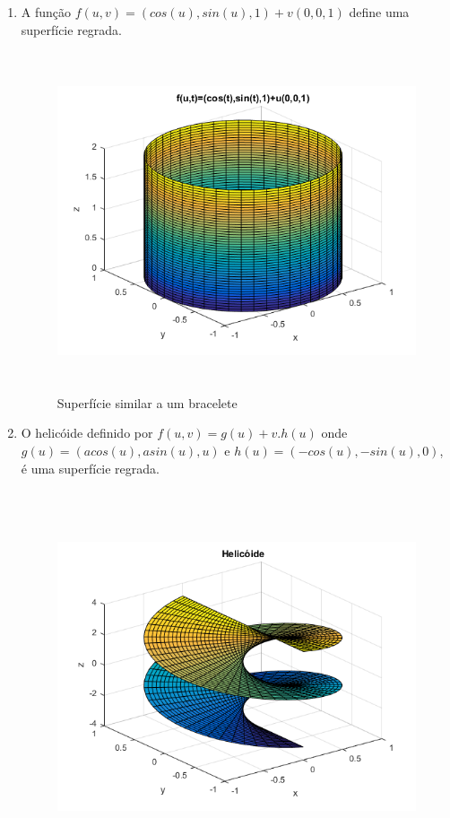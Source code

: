 \documentclass[a4paper]{article}
\begin{document}
\begin{enumerate}
\item A função $f(u,v)=(cos(u),sin(u),1)+v(0,0,1)$ define uma superfície regrada.

\begin{figure}[H]
\centering
\includegraphics[height=10cm]{bracelete.png}
\caption{Superfície similar a um bracelete}
\label{gráfico1}
\end{figure}
\item O helicóide definido por $f(u,v)=g(u)+v.h(u)$ onde $g(u)=(acos(u),asin(u),u)$ e $h(u)=(−cos(u),-sin(u),0)$, é uma superfície regrada.

\begin{figure}[H]
\centering
\includegraphics[height=11cm]{Helicoide_imagem.png}

\end{figure}
\end{enumerate}
\end{document}
